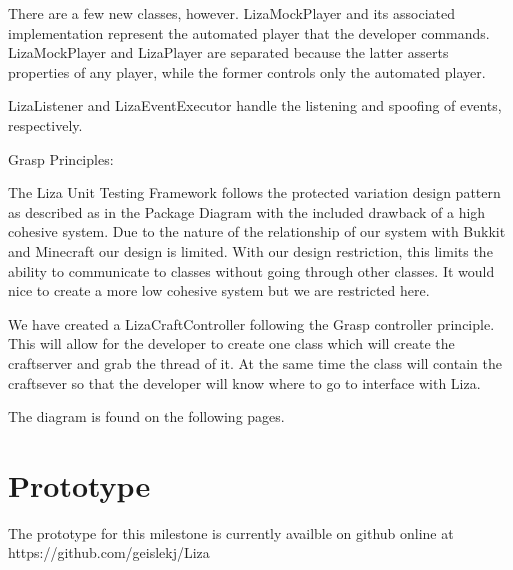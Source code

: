 \documentclass{article}
\begin{document}
\noindent
There are a few new classes, however. LizaMockPlayer and its associated
implementation represent the automated player that the developer
commands. LizaMockPlayer and LizaPlayer are separated because the
latter asserts properties of any player, while the former controls only
the automated player.
\newline

\noindent
LizaListener and LizaEventExecutor handle the listening and spoofing of
events, respectively. 
\newline

\noindent
Grasp Principles:
\newline

\noindent
The Liza Unit Testing Framework follows the protected variation design pattern as
described as in the Package Diagram with the included drawback of a high cohesive system.
Due to the nature of the relationship of our system with Bukkit and Minecraft our design is limited.
With our design restriction, this limits the ability to communicate to classes without going through
other classes.  It would nice to create a more low cohesive system but we are restricted here. \newline 

\noindent
We have created a LizaCraftController following the Grasp controller principle.  This will allow for the developer 
to create one class which will create the craftserver and grab the thread of it.  At the same time the class will
contain the craftsever so that the developer will know where to go to interface with Liza.
\newline



The diagram is found on the following pages.
\newline

\newpage


\newpage
\section{Prototype}

The prototype for this milestone is currently availble on github online at
https://github.com/geislekj/Liza
\end{document}
